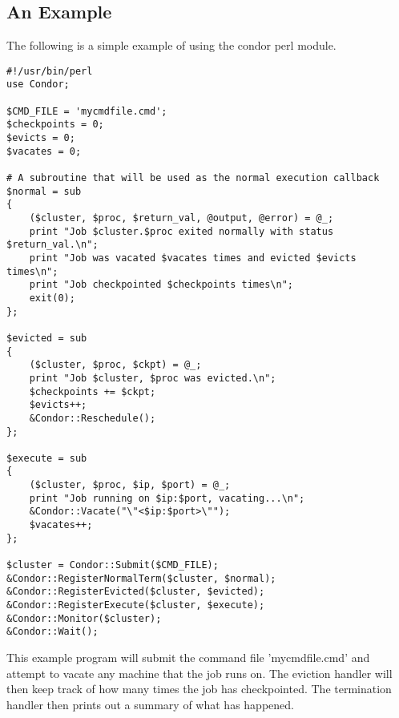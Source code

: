 \subsection{An Example}
The following is a simple example of using the condor perl module.
\begin{verbatim}
#!/usr/bin/perl
use Condor;

$CMD_FILE = 'mycmdfile.cmd';
$checkpoints = 0;
$evicts = 0;
$vacates = 0;

# A subroutine that will be used as the normal execution callback
$normal = sub
{
    ($cluster, $proc, $return_val, @output, @error) = @_;
    print "Job $cluster.$proc exited normally with status $return_val.\n";
    print "Job was vacated $vacates times and evicted $evicts times\n";
    print "Job checkpointed $checkpoints times\n";
    exit(0);
};	

$evicted = sub
{
    ($cluster, $proc, $ckpt) = @_;
    print "Job $cluster, $proc was evicted.\n";
    $checkpoints += $ckpt;
    $evicts++;
    &Condor::Reschedule();	
};

$execute = sub
{
    ($cluster, $proc, $ip, $port) = @_;
    print "Job running on $ip:$port, vacating...\n";
    &Condor::Vacate("\"<$ip:$port>\"");
    $vacates++;
};

$cluster = Condor::Submit($CMD_FILE);
&Condor::RegisterNormalTerm($cluster, $normal);
&Condor::RegisterEvicted($cluster, $evicted);
&Condor::RegisterExecute($cluster, $execute);
&Condor::Monitor($cluster);
&Condor::Wait();
\end{verbatim}

This example program will submit the command file 'mycmdfile.cmd' and attempt
to vacate any machine that the job runs on.  The eviction handler will
then keep track of how many times the job has checkpointed.  The termination
handler then prints out a summary of what has happened.

    

